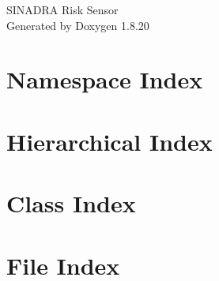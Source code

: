 \let\mypdfximage\pdfximage\def\pdfximage{\immediate\mypdfximage}\documentclass[twoside]{book}
\newcommand{\+}{\discretionary{\mbox{\scriptsize$\hookleftarrow$}}{}{}}
\newcommand{\clearemptydoublepage}{%
  \newpage{\pagestyle{empty}\cleardoublepage}%
}
\begin{document}
\hypersetup{pageanchor=false,
             bookmarksnumbered=true,
             pdfencoding=unicode
            }
\begin{titlepage}
\vspace*{7cm}
\begin{center}%
{\Large S\+I\+N\+A\+D\+RA Risk Sensor }\\
\vspace*{1cm}
{\large Generated by Doxygen 1.8.20}\\
\end{center}
\end{titlepage}
\clearemptydoublepage
{}
\tableofcontents
\clearemptydoublepage
{}
\hypersetup{pageanchor=true}

\chapter{Namespace Index}

\chapter{Hierarchical Index}

\chapter{Class Index}

\chapter{File Index}

\end{document}
